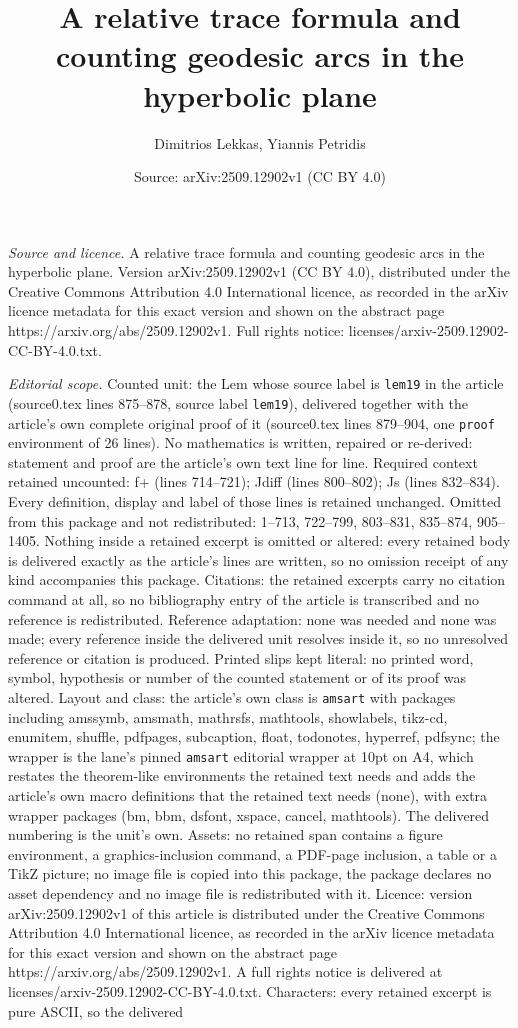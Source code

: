\documentclass[10pt,a4paper]{amsart}
\title[A relative trace formula and counting geodesic arcs in the h]{A relative trace formula and counting geodesic arcs in the hyperbolic plane}
\author{Dimitrios Lekkas, Yiannis Petridis}
\date{Source: arXiv:2509.12902v1 (CC BY 4.0)}
\begin{document}
\maketitle

\noindent\emph{Source and licence.} A relative trace formula and counting geodesic arcs in the hyperbolic plane. Version arXiv:2509.12902v1 (CC BY 4.0), distributed under the Creative Commons Attribution 4.0 International licence, as recorded in the arXiv licence metadata for this exact version and shown on the abstract page https://arxiv.org/abs/2509.12902v1. Full rights notice: licenses/arxiv-2509.12902-CC-BY-4.0.txt.\par\smallskip

\noindent\textit{Editorial scope.} Counted unit: the Lem whose source label is \texttt{lem19} in the article (source0.tex lines 875--878, source label \texttt{lem19}), delivered together with the article's own complete original proof of it (source0.tex lines 879--904, one \texttt{proof} environment of 26 lines). No mathematics is written, repaired or re-derived: statement and proof are the article's own text line for line. Required context retained uncounted: f+ (lines 714--721); Jdiff (lines 800--802); Js (lines 832--834). Every definition, display and label of those lines is retained unchanged. Omitted from this package and not redistributed: 1--713, 722--799, 803--831, 835--874, 905--1405. Nothing inside a retained excerpt is omitted or altered: every retained body is delivered exactly as the article's lines are written, so no omission receipt of any kind accompanies this package. Citations: the retained excerpts carry no citation command at all, so no bibliography entry of the article is transcribed and no reference is redistributed. Reference adaptation: none was needed and none was made; every reference inside the delivered unit resolves inside it, so no unresolved reference or citation is produced. Printed slips kept literal: no printed word, symbol, hypothesis or number of the counted statement or of its proof was altered. Layout and class: the article's own class is \texttt{amsart} with packages including amssymb, amsmath, mathrsfs, mathtools, showlabels, tikz-cd, enumitem, shuffle, pdfpages, subcaption, float, todonotes, hyperref, pdfsync; the wrapper is the lane's pinned \texttt{amsart} editorial wrapper at 10pt on A4, which restates the theorem-like environments the retained text needs and adds the article's own macro definitions that the retained text needs (none), with extra wrapper packages (bm, bbm, dsfont, xspace, cancel, mathtools). The delivered numbering is the unit's own. Assets: no retained span contains a figure environment, a graphics-inclusion command, a PDF-page inclusion, a table or a TikZ picture; no image file is copied into this package, the package declares no asset dependency and no image file is redistributed with it. Licence: version arXiv:2509.12902v1 of this article is distributed under the Creative Commons Attribution 4.0 International licence, as recorded in the arXiv licence metadata for this exact version and shown on the abstract page https://arxiv.org/abs/2509.12902v1. A full rights notice is delivered at licenses/arxiv-2509.12902-CC-BY-4.0.txt. Characters: every retained excerpt is pure ASCII, so the delivered 
\end{document}
